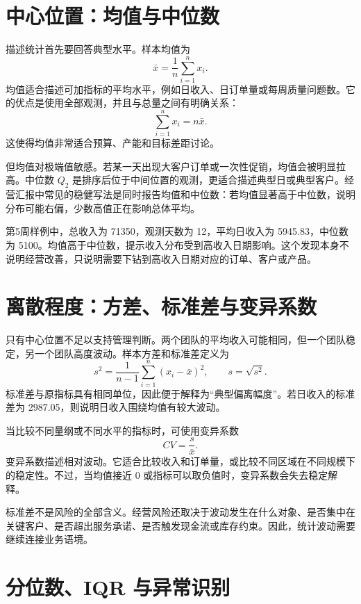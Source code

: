 \documentclass[UTF8,fontset=fandol,openany,zihao=-4]{ctexbook}
\begin{document}
\section{中心位置：均值与中位数}

描述统计首先要回答典型水平。样本均值为
\[
\bar x=\frac{1}{n}\sum_{i=1}^n x_i.
\]
均值适合描述可加指标的平均水平，例如日收入、日订单量或每周质量问题数。它的优点是使用全部观测，并且与总量之间有明确关系：
\[
\sum_{i=1}^n x_i=n\bar x.
\]
这使得均值非常适合预算、产能和目标差距讨论。

但均值对极端值敏感。若某一天出现大客户订单或一次性促销，均值会被明显拉高。中位数 \(Q_2\) 是排序后位于中间位置的观测，更适合描述典型日或典型客户。经营汇报中常见的稳健写法是同时报告均值和中位数：若均值显著高于中位数，说明分布可能右偏，少数高值正在影响总体平均。

\begin{example}[日收入的中心位置]
第5周样例中，总收入为 71350，观测天数为 12，平均日收入为 5945.83，中位数为 5100。均值高于中位数，提示收入分布受到高收入日期影响。这个发现本身不说明经营改善，只说明需要下钻到高收入日期对应的订单、客户或产品。
\end{example}

\section{离散程度：方差、标准差与变异系数}

只有中心位置不足以支持管理判断。两个团队的平均收入可能相同，但一个团队稳定，另一个团队高度波动。样本方差和标准差定义为
\[
s^2=\frac{1}{n-1}\sum_{i=1}^n(x_i-\bar x)^2,\qquad s=\sqrt{s^2}.
\]
标准差与原指标具有相同单位，因此便于解释为“典型偏离幅度”。若日收入的标准差为 2987.05，则说明日收入围绕均值有较大波动。

当比较不同量纲或不同水平的指标时，可使用变异系数
\[
CV=\frac{s}{\bar x}.
\]
变异系数描述相对波动。它适合比较收入和订单量，或比较不同区域在不同规模下的稳定性。不过，当均值接近 0 或指标可以取负值时，变异系数会失去稳定解释。

\begin{remark}
标准差不是风险的全部含义。经营风险还取决于波动发生在什么对象、是否集中在关键客户、是否超出服务承诺、是否触发现金流或库存约束。因此，统计波动需要继续连接业务语境。
\end{remark}

\section{分位数、IQR 与异常识别}
\end{document}
